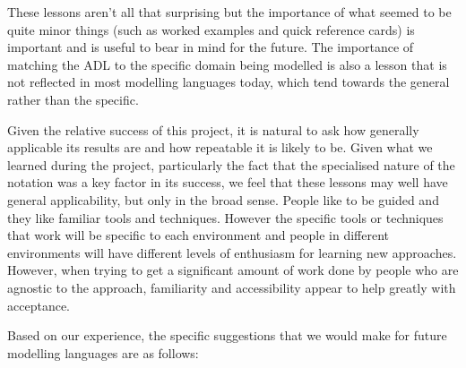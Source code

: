   These lessons aren't all that surprising but the importance of what seemed to be quite minor things (such as worked examples and quick reference cards) is important and is useful to bear in mind for the future.  The importance of matching the ADL to the specific domain being modelled is also a lesson that is not reflected in most modelling languages today, which tend towards the general rather than the specific.  

  Given the relative success of this project, it is natural to ask how generally applicable its results are and how repeatable it is likely to be.  Given what we learned during the project, particularly the fact that the specialised nature of the notation was a key factor in its success, we feel that these lessons may well have general applicability, but only in the broad sense.  People like to be guided and they like familiar tools and techniques.  However the specific tools or techniques that work will be specific to each environment and people in different environments will have different levels of enthusiasm for learning new approaches.  However, when trying to get a significant amount of work done by people who are agnostic to the approach, familiarity and accessibility appear to help greatly with acceptance.

  Based on our experience, the specific suggestions that we would make for future modelling languages are as follows:

